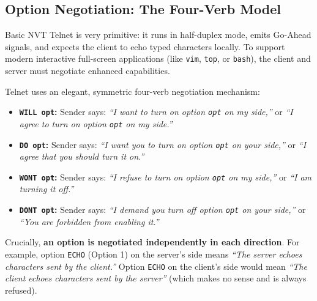 \subsection{Option Negotiation: The Four-Verb Model}

Basic NVT Telnet is very primitive: it runs in half-duplex mode, emits Go-Ahead signals, and expects the client to echo typed characters locally. To support modern interactive full-screen applications (like \texttt{vim}, \texttt{top}, or \texttt{bash}), the client and server must negotiate enhanced capabilities.

Telnet uses an elegant, symmetric four-verb negotiation mechanism:
\begin{itemize}[leftmargin=1.5em]
    \item \textbf{\texttt{WILL opt}:} Sender says: \textit{``I want to turn on option \texttt{opt} on my side,''} or \textit{``I agree to turn on option \texttt{opt} on my side.''}
    \item \textbf{\texttt{DO opt}:} Sender says: \textit{``I want you to turn on option \texttt{opt} on your side,''} or \textit{``I agree that you should turn it on.''}
    \item \textbf{\texttt{WONT opt}:} Sender says: \textit{``I refuse to turn on option \texttt{opt} on my side,''} or \textit{``I am turning it off.''}
    \item \textbf{\texttt{DONT opt}:} Sender says: \textit{``I demand you turn off option \texttt{opt} on your side,''} or \textit{``You are forbidden from enabling it.''}
\end{itemize}

Crucially, \textbf{an option is negotiated independently in each direction}. For example, option \texttt{ECHO} (Option 1) on the server's side means \textit{``The server echoes characters sent by the client.''} Option \texttt{ECHO} on the client's side would mean \textit{``The client echoes characters sent by the server''} (which makes no sense and is always refused).

